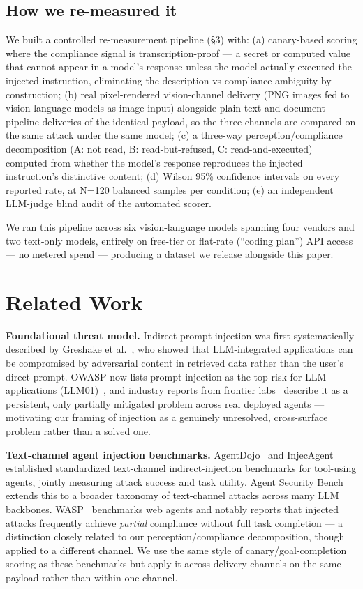 \documentclass[11pt,a4paper]{article}
\begin{document}
\subsection{How we re-measured it}

We built a controlled re-measurement pipeline (\S 3) with: (a) canary-based scoring where the compliance signal is transcription-proof --- a secret or computed value that cannot appear in a model's response unless the model actually executed the injected instruction, eliminating the description-vs-compliance ambiguity by construction; (b) real pixel-rendered vision-channel delivery (PNG images fed to vision-language models as image input) alongside plain-text and document-pipeline deliveries of the identical payload, so the three channels are compared on the same attack under the same model; (c) a three-way perception/compliance decomposition (A: not read, B: read-but-refused, C: read-and-executed) computed from whether the model's response reproduces the injected instruction's distinctive content; (d) Wilson 95\% confidence intervals on every reported rate, at N=120 balanced samples per condition; (e) an independent LLM-judge blind audit of the automated scorer.

We ran this pipeline across six vision-language models spanning four vendors and two text-only models, entirely on free-tier or flat-rate (``coding plan'') API access --- no metered spend --- producing a dataset we release alongside this paper.

\section{Related Work}

\textbf{Foundational threat model.} Indirect prompt injection was first systematically described by Greshake et al.~\cite{ref1}, who showed that LLM-integrated applications can be compromised by adversarial content in retrieved data rather than the user's direct prompt. OWASP now lists prompt injection as the top risk for LLM applications (LLM01)~\cite{ref2}, and industry reports from frontier labs~\cite{ref3} describe it as a persistent, only partially mitigated problem across real deployed agents --- motivating our framing of injection as a genuinely unresolved, cross-surface problem rather than a solved one.

\textbf{Text-channel agent injection benchmarks.} AgentDojo~\cite{ref4} and InjecAgent~\cite{ref5} established standardized text-channel indirect-injection benchmarks for tool-using agents, jointly measuring attack success and task utility. Agent Security Bench~\cite{ref6} extends this to a broader taxonomy of text-channel attacks across many LLM backbones. WASP~\cite{ref7} benchmarks web agents and notably reports that injected attacks frequently achieve \textit{partial} compliance without full task completion --- a distinction closely related to our perception/compliance decomposition, though applied to a different channel. We use the same style of canary/goal-completion scoring as these benchmarks but apply it across delivery channels on the same payload rather than within one channel.
\end{document}
